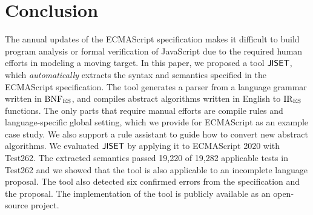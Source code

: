 \section{Conclusion}\label{sec:conclude}
The annual updates of the ECMAScript specification makes it difficult to
build program analysis or formal verification of JavaScript due to the
required human efforts in modeling a moving target.  In this paper,
we proposed a tool \( \text{\sf JISET} \), which \textit{automatically} extracts the
syntax and semantics specified in the ECMAScript specification.  The tool
generates a parser from a language grammar written in \( \text{BNF}_{\text{ES}} \), and
compiles abstract algorithms written in English to \( \text{IR}_\text{ES} \) functions.
The only parts that require manual efforts are compile rules and
language-specific global setting, which we provide for ECMAScript
as an example case study.  We also support a rule assistant to guide
how to convert new abstract algorithms.  We evaluated \( \text{\sf JISET} \) by
applying it to ECMAScript 2020 with Test262.  The extracted semantics
passed 19,220 of 19,282 applicable tests in Test262 and we showed
that the tool is also applicable to an incomplete language proposal.
The tool also detected six confirmed errors from the
specification and the proposal.  The implementation of the tool is
publicly available as an open-source project.

